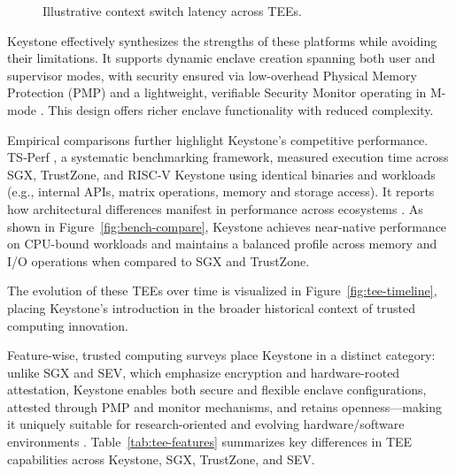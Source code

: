 \begin{figure}[htbp]
\centering
{}
\caption{Illustrative context switch latency across TEEs.}
\label{fig:ctx-overhead}
\end{figure}

Keystone effectively synthesizes the strengths of these platforms while avoiding their limitations. It supports dynamic enclave creation spanning both user and supervisor modes, with security ensured via low-overhead Physical Memory Protection (PMP) and a lightweight, verifiable Security Monitor operating in M-mode \cite{Lee2019}. This design offers richer enclave functionality with reduced complexity.

Empirical comparisons further highlight Keystone’s competitive performance. TS‑Perf \cite{suzaki2021tsperf}, a systematic benchmarking framework, measured execution time across SGX, TrustZone, and RISC‑V Keystone using identical binaries and workloads (e.g., internal APIs, matrix operations, memory and storage access). It reports how architectural differences manifest in performance across ecosystems \cite{turn0search5}. As shown in Figure~\ref{fig:bench-compare}, Keystone achieves near-native performance on CPU-bound workloads and maintains a balanced profile across memory and I/O operations when compared to SGX and TrustZone.

The evolution of these TEEs over time is visualized in Figure~\ref{fig:tee-timeline}, placing Keystone's introduction in the broader historical context of trusted computing innovation.

Feature-wise, trusted computing surveys place Keystone in a distinct category: unlike SGX and SEV, which emphasize encryption and hardware-rooted attestation, Keystone enables both secure and flexible enclave configurations, attested through PMP and monitor mechanisms, and retains openness—making it uniquely suitable for research-oriented and evolving hardware/software environments \cite{turn0search9}. Table~\ref{tab:tee-features} summarizes key differences in TEE capabilities across Keystone, SGX, TrustZone, and SEV.

